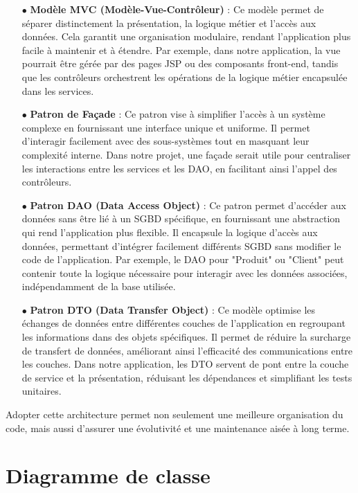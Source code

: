 \begin{itemize}
    \item[$\bullet$] \textbf{Modèle MVC (Modèle-Vue-Contrôleur)} : Ce modèle permet de séparer distinctement la présentation, la logique métier et l'accès aux données. Cela garantit une organisation modulaire, rendant l'application plus facile à maintenir et à étendre. Par exemple, dans notre application, la vue pourrait être gérée par des pages JSP ou des composants front-end, tandis que les contrôleurs orchestrent les opérations de la logique métier encapsulée dans les services.

    \item[$\bullet$] \textbf{Patron de Façade} : Ce patron vise à simplifier l'accès à un système complexe en fournissant une interface unique et uniforme. Il permet d'interagir facilement avec des sous-systèmes tout en masquant leur complexité interne. Dans notre projet, une façade serait utile pour centraliser les interactions entre les services et les DAO, en facilitant ainsi l'appel des contrôleurs.

    \item[$\bullet$] \textbf{Patron DAO (Data Access Object)} : Ce patron permet d'accéder aux données sans être lié à un SGBD spécifique, en fournissant une abstraction qui rend l'application plus flexible. Il encapsule la logique d'accès aux données, permettant d'intégrer facilement différents SGBD sans modifier le code de l'application. Par exemple, le DAO pour "Produit" ou "Client" peut contenir toute la logique nécessaire pour interagir avec les données associées, indépendamment de la base utilisée.

    \item[$\bullet$] \textbf{Patron DTO (Data Transfer Object)} : Ce modèle optimise les échanges de données entre différentes couches de l'application en regroupant les informations dans des objets spécifiques. Il permet de réduire la surcharge de transfert de données, améliorant ainsi l'efficacité des communications entre les couches. Dans notre application, les DTO servent de pont entre la couche de service et la présentation, réduisant les dépendances et simplifiant les tests unitaires.
\end{itemize}

Adopter cette architecture permet non seulement une meilleure organisation du code, mais aussi d'assurer une évolutivité et une maintenance aisée à long terme.

\section{Diagramme de classe}
